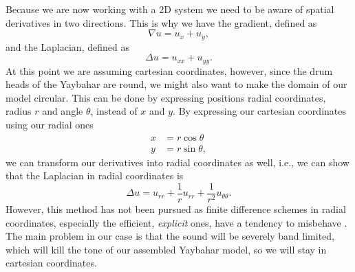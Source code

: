 \documentclass{article}
\begin{document}
Because we are now working with a 2D system we need to be aware of spatial derivatives in two directions.
This is why we have the gradient, defined as
\begin{equation}
  \nabla u = u_x + u_y,
\end{equation}
and the Laplacian, defined as
\begin{equation}
  \Delta u = u_{xx} + u_{yy}.
\end{equation}
At this point we are assuming cartesian coordinates, however, since the drum heads of the Yaybahar are round, we might also want to make the domain of our model circular.
This can be done by expressing positions radial coordinates, radius $r$ and angle $\theta$, instead of $x$ and $y$.
By expressing our cartesian coordinates using our radial ones
\begin{align}
  x &= r \cos \theta\\
  y &= r \sin \theta,
\end{align}
we can transform our derivatives into radial coordinates as well, i.e., we can show that the Laplacian in radial coordinates is
\begin{equation}
  \Delta u = u_{rr} + \frac{1}{r} u_{rr} + \frac{1}{r^2} u_{\theta \theta}.
\end{equation}
%
However, this method has not been pursued as finite difference schemes in radial coordinates, especially the efficient, \textit{explicit} ones, have a tendency to misbehave \cite[Chapter~12]{bilbao_numerical_2009}.
The main problem in our case is that the sound will be severely band limited, which will kill the tone of our assembled Yaybahar model, so we will stay in cartesian coordinates.
\end{document}
